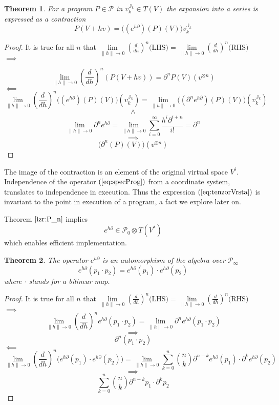 \documentclass{article}
\newcommand{\JJ}{\mathbb{J}}
\newcommand{\dP}{\mathcal{P}}
\newcommand{\D}{\partial}
\newtheorem{izrek}{Theorem}[section]
\begin{document}
\begin{izrek}\label{izr:e^d}
	For a program $P\in\dP$ in $v^{\JJ_k}_{k}\in T(V)$ the expansion into a series is expressed as a contraction\\
	\begin{equation}\label{eq:tenzorVrsta}
	P(V+hv) = \Big((e^{h\D})(P)(V)\Big)v^{\JJ_k}_{k}
	\end{equation}
\end{izrek}
 
 \begin{proof}
It is true for all $n$ that $\lim\limits_{\lVert h\rVert\to 0}(\frac{d}{dh})^n\text{(LHS)}=\lim\limits_{\lVert h\rVert\to 0}(\frac{d}{dh})^n\text{(RHS)}$\\
 $\implies$
 
 $$\lim\limits_{\lVert h\rVert\to 0}(\frac{d}{dh})^n(P(V+hv))=\D^n P(V)(v^{\otimes n})$$
 $\impliedby$
 $$\lim\limits_{\lVert h\rVert\to 0}(\frac{d}{dh})^n\Big((e^{h\D})(P)(V)\Big)(v^{\JJ_k}_{k})=\lim\limits_{\lVert h\rVert\to 0}\Big((\D^n e^{h\D})(P)(V)\Big)(v^{\JJ_k}_{k})$$
 $$\land$$
 $$\lim\limits_{\lVert h\rVert\to 0}\D^ne^{h\D}=\lim\limits_{\lVert h\rVert\to 0}\sum\limits_{i=0}^{\infty}\frac{h^i\D^{i+n}}{i!}=\D^n$$
 $$\implies$$
 $$\Big(\D^n(P)(V)\Big)(v^{\otimes n})$$
 \end{proof}
 
 The image of the contraction is an element of the original virtual space $V^i$. Independence of the operator $(\ref{eq:specProg})$ from a coordinate system, translates to independence in execution. Thus the expression $(\ref{eq:tenzorVrsta})$ is invariant to the point in execution of a program, a fact we explore later on.  
 
 Theorem $\ref{izr:P_n}$ implies
     \begin{equation}
     	e^{h\D}\in\dP_0\otimes T(V^*)
     \end{equation}      
which enables efficient implementation.
 
 \begin{izrek}\label{izr:prod}
 The operator $e^{h\D}$ is an automorphism of the algebra over $\dP_\infty$
 \begin{equation}
 	e^{h\D}(p_1\cdot p_2)=e^{h\D}(p_1)\cdot e^{h\D}(p_2)
 \end{equation}
 where $\cdot$ stands for a bilinear map.
 \end{izrek}
 
 \begin{proof}
 It is true for all $n$ that $\lim\limits_{\lVert h\rVert\to 0}(\frac{d}{dh})^n\text{(LHS)}=\lim\limits_{\lVert h\rVert\to 0}(\frac{d}{dh})^n\text{(RHS)}$\\
  $\implies$
  $$\lim\limits_{\lVert h\rVert\to 0}(\frac{d}{dh})^ne^{h\D}(p_1\cdot p_2)=\lim\limits_{\lVert h\rVert\to 0}\D^ne^{h\D}(p_1\cdot p_2)$$
  $$\implies$$
  $$\D^n(p_1\cdot p_2)$$
  $\impliedby$
  $$\lim\limits_{\lVert h\rVert\to 0}(\frac{d}{dh})^n\Big(e^{h\D}(p_1)\cdot e^{h\D}(p_2)\Big)=\lim\limits_{\lVert h\rVert\to 0}\sum\limits_{k=0}^{n}{n\choose k}\D^{n-k}e^{h\D}(p_1)\cdot \D^ke^{h\D}(p_2)$$
  $$\implies$$
  $$\sum\limits_{k=0}^{n}{n\choose k}\D^{n-k}p_1\cdot \D^kp_2$$
 \end{proof}
 
\end{document}
